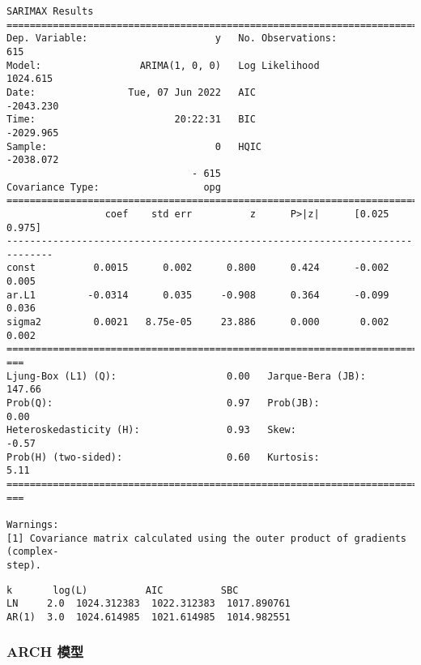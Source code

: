 \documentclass[11pt]{article}
\makeatletter
\newcommand{\boxspacing}{\kern\kvtcb@left@rule\kern\kvtcb@boxsep}
\newcommand{\prompt}[4]{
        {\ttfamily\llap{{\color{#2}[#3]:\hspace{3pt}#4}}\vspace{-\baselineskip}}
    }
\makeatother
\begin{document}
    \begin{Verbatim}[commandchars=\\\{\}]
                               SARIMAX Results
==============================================================================
Dep. Variable:                      y   No. Observations:                  615
Model:                 ARIMA(1, 0, 0)   Log Likelihood                1024.615
Date:                Tue, 07 Jun 2022   AIC                          -2043.230
Time:                        20:22:31   BIC                          -2029.965
Sample:                             0   HQIC                         -2038.072
                                - 615
Covariance Type:                  opg
==============================================================================
                 coef    std err          z      P>|z|      [0.025      0.975]
------------------------------------------------------------------------------
const          0.0015      0.002      0.800      0.424      -0.002       0.005
ar.L1         -0.0314      0.035     -0.908      0.364      -0.099       0.036
sigma2         0.0021   8.75e-05     23.886      0.000       0.002       0.002
================================================================================
===
Ljung-Box (L1) (Q):                   0.00   Jarque-Bera (JB):
147.66
Prob(Q):                              0.97   Prob(JB):
0.00
Heteroskedasticity (H):               0.93   Skew:
-0.57
Prob(H) (two-sided):                  0.60   Kurtosis:
5.11
================================================================================
===

Warnings:
[1] Covariance matrix calculated using the outer product of gradients (complex-
step).
    \end{Verbatim}

            \begin{tcolorbox}[breakable, size=fbox, boxrule=.5pt, pad at break*=1mm, opacityfill=0]
\prompt{Out}{outcolor}{15}{\boxspacing}
\begin{Verbatim}[commandchars=\\\{\}]
         k       log(L)          AIC          SBC
LN     2.0  1024.312383  1022.312383  1017.890761
AR(1)  3.0  1024.614985  1021.614985  1014.982551
\end{Verbatim}
\end{tcolorbox}
        
    \hypertarget{arch-ux6a21ux578b}{%
\subsubsection{ARCH 模型}\label{arch-ux6a21ux578b}}
\end{document}
